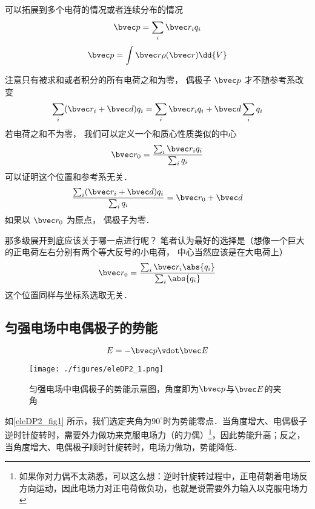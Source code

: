 

可以拓展到多个电荷的情况或者连续分布的情况
\begin{equation}
\bvec p = \sum_i \bvec r_i q_i
\end{equation}
\begin{equation}
\bvec p = \int \bvec r \rho(\bvec r) \dd{V}
\end{equation}

注意只有被求和或者积分的所有电荷之和为零， 偶极子 $\bvec p$ 才不随参考系改变
\begin{equation}
\sum_i (\bvec r_i + \bvec d) q_i = \sum_i \bvec r_i q_i + \bvec d \sum_i q_i
\end{equation}
若电荷之和不为零， 我们可以定义一个和质心性质类似的中心
\begin{equation}
\bvec r_0 = \frac{\sum_i \bvec r_i q_i}{\sum_i q_i}
\end{equation}
可以证明这个位置和参考系无关．
\begin{equation}
\frac{\sum_i (\bvec r_i + \bvec d) q_i}{\sum_i q_i} = \bvec r_0 + \bvec d
\end{equation}
如果以 $\bvec r_0$ 为原点， 偶极子为零．

那多级展开到底应该关于哪一点进行呢？ 笔者认为最好的选择是（想像一个巨大的正电荷左右分别有两个等大反号的小电荷， 中心当然应该是在大电荷上）
\begin{equation}
\bvec r_0 = \frac{\sum_i \bvec r_i \abs{q_i}}{\sum_i \abs{q_i}}
\end{equation}
这个位置同样与坐标系选取无关．

\subsection{匀强电场中电偶极子的势能}
\begin{equation}\label{eleDP2_eq1}
E = -\bvec p \vdot \bvec E
\end{equation}
\begin{figure}[ht]
\centering
\texttt{[image: ./figures/eleDP2\_1.png]}
\caption{匀强电场中电偶极子的势能示意图，角度即为$\bvec p$与$\bvec E$的夹角} \label{eleDP2_fig1}
\end{figure}
如\autoref{eleDP2_fig1} 所示，我们选定夹角为$90^\circ$时为势能零点．当角度增大、电偶极子逆时针旋转时，需要外力做功来克服电场力（的力偶）\footnote{如果你对力偶不太熟悉，可以这么想：逆时针旋转过程中，正电荷朝着电场反方向运动，因此电场力对正电荷做负功，也就是说需要外力输入以克服电场力}，因此势能升高；反之，当角度增大、电偶极子顺时针旋转时，电场力做功，势能降低．